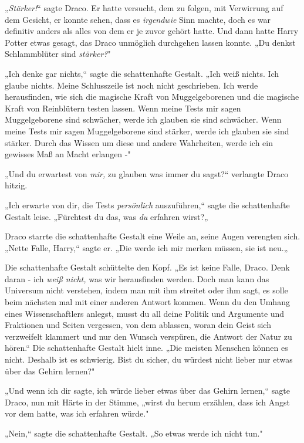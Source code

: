 {„\emph{Stärker!}“ sagte Draco. Er hatte versucht, dem zu folgen, mit Verwirrung auf dem Gesicht, er konnte sehen, dass es \emph{irgendwie} Sinn machte, doch es war definitiv anders als alles von dem er je zuvor gehört hatte. Und dann hatte Harry Potter etwas gesagt, das Draco unmöglich durchgehen lassen konnte. „Du denkst Schlammblüter sind \emph{stärker?}"

„Ich denke gar nichts,“ sagte die schattenhafte Gestalt. „Ich weiß nichts. Ich glaube nichts. Meine Schlusszeile ist noch nicht geschrieben. Ich werde herausfinden, wie sich die magische Kraft von Muggelgeborenen und die magische Kraft von Reinblütern testen lassen. Wenn meine Tests mir sagen Muggelgeborene sind schwächer, werde ich glauben sie sind schwächer. Wenn meine Tests mir sagen Muggelgeborene sind stärker, werde ich glauben sie sind stärker. Durch das Wissen um diese und andere Wahrheiten, werde ich ein gewisses Maß an Macht erlangen -"

„Und du erwartest von \emph{mir,} zu glauben was immer du sagst?“ verlangte Draco hitzig.

„Ich erwarte von dir, die Tests \emph{persönlich} auszuführen,“ sagte die schattenhafte Gestalt leise. „Fürchtest du das, was \emph{du} erfahren wirst?„

Draco starrte die schattenhafte Gestalt eine Weile an, seine Augen verengten sich. „Nette Falle, Harry,“ sagte er. „Die werde ich mir merken müssen, sie ist neu.„

Die schattenhafte Gestalt schüttelte den Kopf. „Es ist keine Falle, Draco. Denk daran - ich \emph{weiß nicht,} was wir herausfinden werden. Doch man kann das Universum nicht verstehen, indem man mit ihm streitet oder ihm sagt, es solle beim nächsten mal mit einer anderen Antwort kommen. Wenn du den Umhang eines Wissenschaftlers anlegst, musst du all deine Politik und Argumente und Fraktionen und Seiten vergessen, von dem ablassen, woran dein Geist sich verzweifelt klammert und nur den Wunsch verspüren, die Antwort der Natur zu hören.“ Die schattenhafte Gestalt hielt inne. „Die meisten Menschen können es nicht. Deshalb ist es schwierig. Bist du sicher, du würdest nicht lieber nur etwas über das Gehirn lernen?"

„Und wenn ich dir sagte, ich würde lieber etwas über das Gehirn lernen,“ sagte Draco, nun mit Härte in der Stimme, „wirst du herum erzählen, dass ich Angst vor dem hatte, was ich erfahren würde."

„Nein,“ sagte die schattenhafte Gestalt. „So etwas werde ich nicht tun."

}
